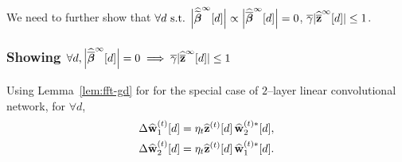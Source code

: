 \documentclass{article}
\newcommand{\remove}[1]{{}}
\renewcommand{\b}{\mathbf}
\renewcommand{\hat}{\widehat}
\renewcommand{\tilde}{\widetilde}
\renewcommand{\bar}{\overline}
\newcommand{\st}{\text{ s.t. }}
\renewcommand{\u}[1][]{\ifthenelse{\equal{#1}{}}{\mathbf{w}}{\mathbf{w}^{(#1)}}}
\newcommand{\w}[1][]{\ifthenelse{\equal{#1}{}}{\boldsymbol{\beta}}{\boldsymbol{\beta}^{(#1)}}}
\newcommand{\z}[1][]{\ifthenelse{\equal{#1}{}}{\mathbf{z}}{\mathbf{z}^{(#1)}}}
\begin{document}
{We need to further show that $\forall d\st \Big|\hat{\tilde{\w}}^{\infty}[d]\Big|\propto \Big|\hat{\bar{\w}}^{\infty}[d]\Big|=0$, $\bar{\gamma}|\hat{\bar{\z}}^\infty[d]|\le 1$. 
\subsubsection*{Showing  $\forall d, \Big|\hat{\bar{\w}}^{\infty}[d]\Big|=0\implies\bar{\gamma}|\hat{\bar{\z}}^\infty[d]|\le 1$}
Using Lemma~\ref{lem:fft-gd} for for the special case of $2$--layer linear convolutional network, for $\forall d$,
\begin{equation}
\begin{split}
\Delta\hat{\u}_1^{(t)}[d]&=\eta_t\hat{\z}^{(t)}[d]\,{{\hat{\u}^{(t)*}_{2}}}[d],\\
\Delta\hat{\u}_2^{(t)}[d]&=\eta_t\hat{\z}^{(t)}[d]\,{{\hat{\u}^{(t)*}_{1}}}[d].
\end{split}
\label{eq:cn-grad-2}
\end{equation}

\remove{
\paragraph{Simple case: real valued diagonal networks} For simplicity, we first prove this part of the result for real valued diagonal networks. The proof for complex variables is analogous. The corresponding update equations in eq. \eqref{eq:cn-grad-2} for real valued diagonal networks are given below:
\begin{equation}
\begin{split}
\Delta{\u}_1^{(t)}[d]&=\eta_t{\z}^{(t)}[d]\,{{{\u}^{(t)}_{2}}}[d],\\
\Delta{\u}_2^{(t)}[d]&=\eta_t{\z}^{(t)}[d]\,{{{\u}^{(t)}_{1}}}[d].
\end{split}
\label{eq:diag-grad-2}
\end{equation}
Now consider the dynamics of $\b{u}_d^{(t)}:=\text{sign}(\bar\u_1^\infty){\u}_1^{(t)}[d]+\text{sign}(\bar\u_2^\infty){\u}_2^{(t)}[d]$. 


Since for $l=1,2$, $\u[t]_l/g(t)\to\bar{\u}_l^\infty$, we have the following:
\begin{equation}
\begin{split}
\lim_{t\to\infty}\frac{\b{u}_d^{(t)}}{g(t)}&=\text{sign}(\bar\u_1^\infty){\bar\u}_1^\infty[d]+\text{sign}(\bar\u_2^\infty){\bar\u}_2^{\infty}[d]=|{\bar\u}_1^\infty[d]|+|{\bar\u}_2^{\infty}[d]|
\overset{(a)}=2\sqrt{|\bar\w^\infty[d]|}
\end{split}
\label{eq:cn-uddiag}
\end{equation}
where $(a)$ follows from eq. \eqref{eq:cn_slack_pnorm} which implies that for all $l$, $|\bar\u_l^\infty[d]|$ have the same magnitude, and hence  $|\bar\u_l^\infty[d]|=|\bar\w^\infty[d]|^{1/L}$. 

}}
\end{document}

